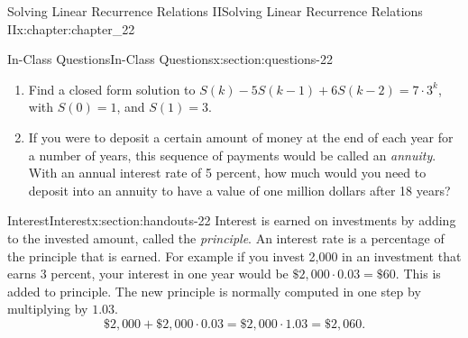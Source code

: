 \documentclass[oneside,10pt,]{book}
\numberwithin{equation}{section}
\begin{document}
\begin{chapterptx}{Solving Linear Recurrence Relations II}{}{Solving Linear Recurrence Relations II}{}{}{x:chapter:chapter_22}
\begin{sectionptx}{In-Class Questions}{}{In-Class Questions}{}{}{x:section:questions-22}
\begin{enumerate}[label=\arabic*.]
\item{}Find a closed form solution to \(S(k) - 5S(k - 1) + 6S(k - 2) = 7 \cdot 3^k\), with \(S(0) = 1\), and \(S(1) = 3\).%
\item{}If you were to deposit a certain amount of money at the end of each year for a number of years, this sequence of payments would be called an \emph{annuity}.  With an annual interest rate of 5 percent, how much would you need to deposit into an annuity to have a value of one million dollars after 18 years?%
\end{enumerate}
%
\end{sectionptx}
%
%
\typeout{************************************************}
\typeout{************************************************}
%
\begin{sectionptx}{Interest}{}{Interest}{}{}{x:section:handouts-22}
Interest is earned on investments by adding to the invested amount, called the \emph{principle}. An interest rate is a percentage of the principle that is earned.  For example if you invest \textdollar{}2,000 in an investment  that earns 3 percent, your interest in one year would be \(\$2,000\cdot 0.03 =\$60\).  This is added to principle.  The new principle is normally computed in one step by multiplying by \(1.03\).%
\begin{equation*}
\$2,000+ \$2,000\cdot 0.03 =\$2,000\cdot 1.03 =  \$2,060.
\end{equation*}
%
\end{sectionptx}
\end{chapterptx}
%
%
\typeout{************************************************}
\typeout{************************************************}
%
\end{document}
